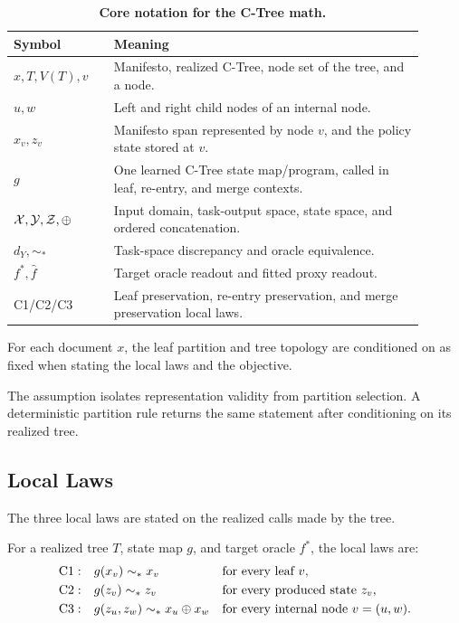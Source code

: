 \begin{table}[t]
  \centering
  \small
  \begin{tabular}{@{}p{0.22\linewidth}p{0.68\linewidth}@{}}
    \toprule
    Symbol & Meaning \\
    \midrule
    \(x,T,V(T),v\) & Manifesto, realized C-Tree, node set of the tree, and a node. \\
    \(u,w\) & Left and right child nodes of an internal node. \\
    \(x_v,z_v\) & Manifesto span represented by node \(v\), and the policy state stored at \(v\). \\
    \(g\) & One learned C-Tree state map/program, called in leaf, re-entry, and merge contexts. \\
    \(\mathcal X,\mathcal Y,\mathcal Z,\oplus\) & Input domain, task-output space, state space, and ordered concatenation. \\
    \(d_Y,\sim_\ast\) & Task-space discrepancy and oracle equivalence. \\
    \(f^\ast,\widehat f\) & Target oracle readout and fitted proxy readout. \\
    C1/C2/C3 & Leaf preservation, re-entry preservation, and merge preservation local laws. \\
    \bottomrule
  \end{tabular}
  \caption{\textbf{Core notation for the C-Tree math.}}
  \label{tab:v8-core-notation}
\end{table}

\begin{assumption}\label{ass:v8-fixed-tree}
For each document \(x\), the leaf partition and tree topology are conditioned
on as fixed when stating the local laws and the objective.
\end{assumption}

The assumption isolates representation validity from partition selection. A
deterministic partition rule returns the same statement after conditioning on
its realized tree.

\subsection{Local Laws}

The three local laws are stated on the realized calls made by the tree.

\begin{definition}\label{def:v8-local-laws}
For a realized tree \(T\), state map \(g\), and target oracle \(f^\ast\), the
local laws are:
\[
\begin{aligned}
\mathrm{C1:}\quad&
g(x_v)\sim_\ast x_v
&&\text{for every leaf }v,\\
\mathrm{C2:}\quad&
g(z_v)\sim_\ast z_v
&&\text{for every produced state }z_v,\\
\mathrm{C3:}\quad&
g(z_u,z_w)\sim_\ast x_u\oplus x_w
&&\text{for every internal node }v=(u,w).
\end{aligned}
\]
\end{definition}

